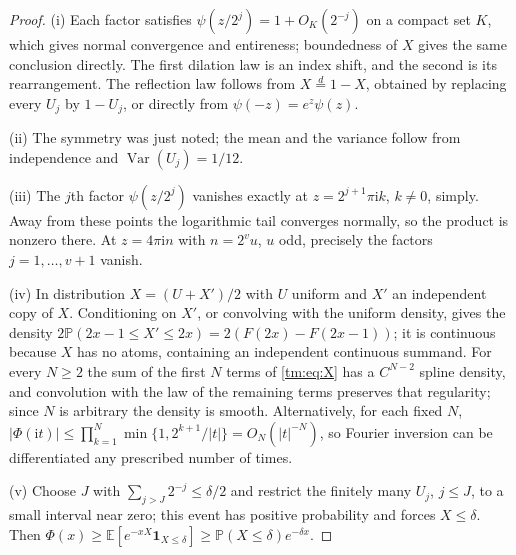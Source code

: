 \documentclass[11pt,a4paper,oneside,openany]{book}
\numberwithin{equation}{chapter}
\theoremstyle{definition}
\theoremstyle{remark}
\newcommand{\E}{\mathbb E}
\newcommand{\Prob}{\mathbb P}
\newcommand{\ii}{\mathrm i}
\begin{document}
\begin{proof}
(i) Each factor satisfies $\psi(z/2^j)=1+O_K(2^{-j})$ on a compact set
$K$, which gives normal convergence and entireness; boundedness of $X$
gives the same conclusion directly. The first dilation law is an index
shift, and the second is its rearrangement. The reflection law follows from
$X\overset d=1-X$, obtained by replacing every $U_j$ by $1-U_j$, or directly
from $\psi(-z)=e^z\psi(z)$.

(ii) The symmetry was just noted; the mean and the variance follow from
independence and $\operatorname{Var}(U_j)=1/12$.

(iii) The $j$th factor $\psi(z/2^j)$ vanishes exactly at $z=2^{j+1}\pi\ii k$,
$k\ne0$, simply. Away from these points the logarithmic tail converges
normally, so the product is nonzero there. At $z=4\pi\ii n$ with
$n=2^{v}u$, $u$ odd, precisely the factors $j=1,\ldots,v+1$ vanish.

(iv) In distribution $X=(U+X')/2$ with $U$ uniform and $X'$ an independent
copy of $X$. Conditioning on $X'$, or convolving with the uniform density,
gives the density $2\Prob(2x-1\le X'\le2x)=2(F(2x)-F(2x-1))$; it is
continuous because $X$ has no atoms, containing an independent continuous
summand. For every $N\ge2$ the sum of the first $N$ terms of
\eqref{tm:eq:X} has a $C^{N-2}$ spline density, and convolution with the
law of the remaining terms preserves that regularity; since $N$ is
arbitrary the density is smooth. Alternatively, for each fixed $N$,
$|\Phi(\ii t)|\le\prod_{k=1}^N\min\{1,2^{k+1}/|t|\}=O_N(|t|^{-N})$, so
Fourier inversion can be differentiated any prescribed number of times.

(v) Choose $J$ with $\sum_{j>J}2^{-j}\le\delta/2$ and restrict the finitely
many $U_j$, $j\le J$, to a small interval near zero; this event has positive
probability and forces $X\le\delta$. Then
$\Phi(x)\ge\E[e^{-xX}\mathbf 1_{X\le\delta}]\ge\Prob(X\le\delta)e^{-\delta x}$.
\end{proof}
\end{document}
